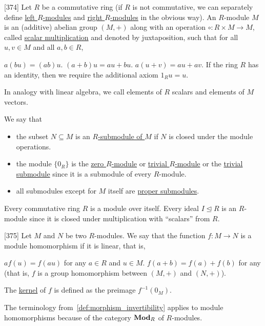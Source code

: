 \begin{definition}\label{def:module}\cite{Knapp2016BAlg}[374]
  Let $R$ be a commutative ring (if $R$ is not commutative, we can separately define \uline{left $R$-modules} and \uline{right $R$-modules} in the obvious way). An $R$-module $M$ is an (additive) abelian group $(M, +)$ along with an operation $\circ: R \times M \to M$, called \uline{scalar multiplication} and denoted by juxtaposition, such that for all $u, v \in M$ and all $a, b \in R$,
  \begin{description}
     $a (b u) = (a b) u$.
     $(a + b) u = a u + b u$.
     $a (u + v) = a u + a v$.
     If the ring $R$ has an identity, then we require the additional axiom $1_R u = u$.
  \end{description}

  In analogy with linear algebra, we call elements of $R$ scalars and elements of $M$ vectors.

  We say that
  \begin{itemize}
    \item the subset $N \subseteq M$ is an \uline{$R$-submodule of $M$} if $N$ is closed under the module operations.
    \item the module $\{ 0_R \}$ is the \uline{zero $R$-module} or \uline{trivial $R$-module} or the \uline{trivial submodule} since it is a submodule of every $R$-module.
    \item all submodules except for $M$ itself are \uline{proper submodules}.
  \end{itemize}
\end{definition}

\begin{example}\label{ex:module/ideal}
  Every commutative ring $R$ is a module over itself. Every ideal $I \unlhd R$ is an $R$-module since it is closed under multiplication with \enquote{scalars} from $R$.
\end{example}

\begin{definition}\label{def:module_homomorphism}\cite{Knapp2016BAlg}[375]
  Let $M$ and $N$ be two $R$-modules. We say that the function $f: M \to N$ is a module homomorphism if it is linear, that is,
  \begin{description}
     $a f(u) = f(a u)$ for any $a \in R$ and $u \in M$.
     $f(a + b) = f(a) + f(b)$ for any (that is, $f$ is a group homomorphism between $(M, +)$ and $(N, +)$).
  \end{description}

  The \uline{kernel} of $f$ is defined as the preimage $f^{-1}(0_M)$.

  The terminology from~\cref{def:morphism_invertibility} applies to module homomorphisms because of the category $\operatorname{\mathbf{Mod}}_R$ of $R$-modules.
\end{definition}

